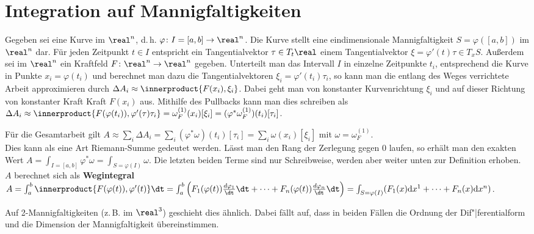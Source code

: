 \pagebreak

\section{%
    Integration auf Mannigfaltigkeiten%
}

Gegeben sei eine Kurve im $\real^n$, d.\,h.
$\varphi\colon I = [a, b] \rightarrow \real^n$.
Die Kurve stellt eine eindimensionale Mannigfaltigkeit $S = \varphi([a, b])$
im $\real^n$ dar.
Für jeden Zeitpunkt $t \in I$ entspricht ein Tangentialvektor
$\tau \in T_t \real$ einem Tangentialvektor $\xi = \varphi'(t) \tau \in T_x S$.
Außerdem sei im $\real^n$ ein Kraftfeld
$F\colon \real^n \rightarrow \real^n$ gegeben.
Unterteilt man das Intervall $I$ in einzelne Zeitpunkte $t_i$,
entsprechend die Kurve in Punkte $x_i = \varphi(t_i)$ und
berechnet man dazu die Tangentialvektoren $\xi_i = \varphi'(t_i) \tau_i$,
so kann man die entlang des Weges verrichtete Arbeit approximieren durch
$\Delta A_i \approx \innerproduct{F(x_i), \xi_i}$.
Dabei geht man von konstanter Kurvenrichtung $\xi_i$ und auf dieser Richtung
von konstanter Kraft Kraft $F(x_i)$ aus.
Mithilfe des Pullbacks kann man dies schreiben als
$\Delta A_i \approx \innerproduct{F(\varphi(t_i)), \varphi'(\tau)\tau_i} =
\omega_F^{(1)}(x_i)[\xi_i] = (\varphi^\ast \omega_F^{(1)})(t_i)[\tau_i]$.

Für die Gesamtarbeit gilt $A \approx \sum_i \Delta A_i =
\sum_i (\varphi^\ast \omega)(t_i)[\tau_i] = \sum_i \omega(x_i)[\xi_i]$ mit
$\omega = \omega_F^{(1)}$. \\
Dies kann als eine Art Riemann-Summe gedeutet werden.
Lässt man den Rang der Zerlegung gegen $0$ laufen, so erhält man den exakten
Wert $A = \int_{I = [a,b]} \varphi^\ast \omega = \int_{S = \varphi(I)} \omega$.
Die letzten beiden Terme sind nur Schreibweise, werden aber weiter unten
zur Definition erhoben.
$A$ berechnet sich als \textbf{Wegintegral}
$A = \int_a^b \innerproduct{F(\varphi(t)), \varphi'(t)} \dt =
\int_a^b \left(F_1(\varphi(t)) \frac{d \varphi_1}{\dt} \dt + \dotsb +
F_n(\varphi(t)) \frac{d \varphi_n}{\dt} \dt\right) =
\int_{S = \varphi(I)} (F_1(x) \d x^1 + \dotsb + F_n(x) \d x^n)$.

Auf 2-Mannigfaltigkeiten (z.\,B. im $\real^3$) geschieht dies ähnlich.
Dabei fällt auf, dass in beiden Fällen die Ordnung der Dif"|ferentialform
und die Dimension der Mannigfaltigkeit übereinstimmen.

\linie

